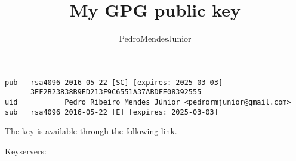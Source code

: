 

% 

\renewcommand\highlightauthorname[1]{#1}

\title{My GPG public key}
\author{\gls{PedroMendesJunior}\\%
}
\date{}



\maketitle

\begin{verbatim}
pub   rsa4096 2016-05-22 [SC] [expires: 2025-03-03]
      3EF2B23838B9ED213F9C6551A37ABDFE08392555
uid           Pedro Ribeiro Mendes Júnior <pedrormjunior@gmail.com>
sub   rsa4096 2016-05-22 [E] [expires: 2025-03-03]
\end{verbatim}

The key is available through the following link.

\begin{center}
\end{center}

Keyservers:

\\




